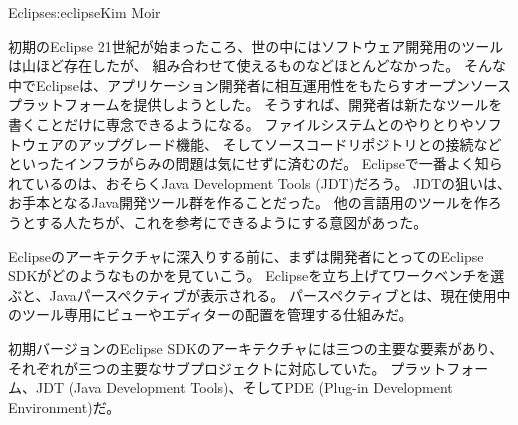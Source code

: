 \begin{aosachapter}{Eclipse}{s:eclipse}{Kim Moir}
\begin{aosasect1}{初期のEclipse}
21世紀が始まったころ、世の中にはソフトウェア開発用のツールは山ほど存在したが、
組み合わせて使えるものなどほとんどなかった。
そんな中でEclipseは、アプリケーション開発者に相互運用性をもたらすオープンソースプラットフォームを提供しようとした。
そうすれば、開発者は新たなツールを書くことだけに専念できるようになる。
ファイルシステムとのやりとりやソフトウェアのアップグレード機能、
そしてソースコードリポジトリとの接続などといったインフラがらみの問題は気にせずに済むのだ。
Eclipseで一番よく知られているのは、おそらくJava Development Tools (JDT)だろう。
JDTの狙いは、お手本となるJava開発ツール群を作ることだった。
他の言語用のツールを作ろうとする人たちが、これを参考にできるようにする意図があった。

Eclipseのアーキテクチャに深入りする前に、まずは開発者にとってのEclipse SDKがどのようなものかを見ていこう。
Eclipseを立ち上げてワークベンチを選ぶと、Javaパースペクティブが表示される。
パースペクティブとは、現在使用中のツール専用にビューやエディターの配置を管理する仕組みだ。


初期バージョンのEclipse SDKのアーキテクチャには三つの主要な要素があり、
それぞれが三つの主要なサブプロジェクトに対応していた。
プラットフォーム、JDT (Java Development Tools)、そしてPDE (Plug-in Development Environment)だ。


\end{aosasect1}
\end{aosachapter}
